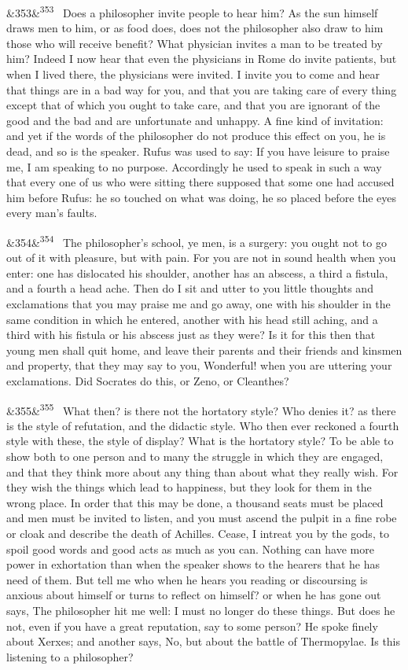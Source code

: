 \documentclass[12pt]{article}
\newcommand{\para}[1][]{\par\noindent\ifx&#1&\else\textsuperscript{\footnotesize #1}~\fi}
\begin{document}
\para[353] Does a philosopher invite people to hear him? As the sun himself draws men to him, or as food does, does not the philosopher also draw to him those who will receive benefit? What physician invites a man to be treated by him? Indeed I now hear that even the physicians in Rome do invite patients, but when I lived there, the physicians were invited. I invite you to come and hear that things are in a bad way for you, and that you are taking care of every thing except that of which you ought to take care, and that you are ignorant of the good and the bad and are unfortunate and unhappy. A fine kind of invitation: and yet if the words of the philosopher do not produce this effect on you, he is dead, and so is the speaker. Rufus was used to say: If you have leisure to praise me, I am speaking to no purpose. Accordingly he used to speak in such a way that every one of us who were sitting there supposed that some one had accused him before Rufus: he so touched on what was doing, he so placed before the eyes every man's faults.

\para[354] The philosopher's school, ye men, is a surgery: you ought not to go out of it with pleasure, but with pain. For you are not in sound health when you enter: one has dislocated his shoulder, another has an abscess, a third a fistula, and a fourth a head ache. Then do I sit and utter to you little thoughts and exclamations that you may praise me and go away, one with his shoulder in the same condition in which he entered, another with his head still aching, and a third with his fistula or his abscess just as they were? Is it for this then that young men shall quit home, and leave their parents and their friends and kinsmen and property, that they may say to you, Wonderful! when you are uttering your exclamations. Did Socrates do this, or Zeno, or Cleanthes?

\para[355] What then? is there not the hortatory style? Who denies it? as there is the style of refutation, and the didactic style. Who then ever reckoned a fourth style with these, the style of display? What is the hortatory style? To be able to show both to one person and to many the struggle in which they are engaged, and that they think more about any thing than about what they really wish. For they wish the things which lead to happiness, but they look for them in the wrong place. In order that this may be done, a thousand seats must be placed and men must be invited to listen, and you must ascend the pulpit in a fine robe or cloak and describe the death of Achilles. Cease, I intreat you by the gods, to spoil good words and good acts as much as you can. Nothing can have more power in exhortation than when the speaker shows to the hearers that he has need of them. But tell me who when he hears you reading or discoursing is anxious about himself or turns to reflect on himself? or when he has gone out says, The philosopher hit me well: I must no longer do these things. But does he not, even if you have a great reputation, say to some person? He spoke finely about Xerxes; and another says, No, but about the battle of Thermopylae. Is this listening to a philosopher?
\end{document}
